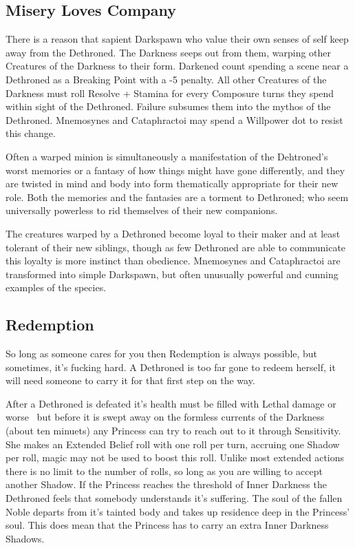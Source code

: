 \subsection*{Misery Loves Company}

There is a reason that sapient Darkspawn who value their own senses of self keep away from the Dethroned. The Darkness seeps out from them, warping other Creatures of the Darkness to their form. Darkened count spending a scene near a Dethroned as a Breaking Point with a -5 penalty. All other Creatures of the Darkness must roll Resolve + Stamina for every Composure turns they spend within sight of the Dethroned. Failure subsumes them into the mythos of the Dethroned. Mnemosynes and Cataphractoi may spend a Willpower dot to resist this change. 

Often a warped minion is simultaneously a manifestation of the Dehtroned's worst memories or a fantasy of how things might have gone differently, and they are twisted in mind and body into form thematically appropriate for their new role. Both the memories and the fantasies are a torment to Dethroned; who seem universally powerless to rid themselves of their new companions. 

The creatures warped by a Dethroned become loyal to their maker and at least tolerant of their new siblings, though as few Dethroned are able to communicate this loyalty is more instinct than obedience. Mnemosynes and Cataphractoi are transformed into simple Darkspawn, but often unusually powerful and cunning examples of the species. 

\subsection*{Redemption}

So long as someone cares for you then Redemption is always possible, but sometimes, it's fucking hard. A Dethroned is too far gone to redeem herself, it will need someone to carry it for that first step on the way. 

After a Dethroned is defeated \textendash it's health must be filled with Lethal damage or worse \textendash\, but before it is swept away on the formless currents of the Darkness (about ten minuets) any Princess can try to reach out to it through Sensitivity. She makes an Extended Belief roll with one roll per turn, accruing one Shadow per roll, magic may not be used to boost this roll. Unlike most extended actions there is no limit to the number of rolls, so long as you are willing to accept another Shadow. If the Princess reaches the threshold of Inner Darkness the Dethroned feels that somebody understands it's suffering. The soul of the fallen Noble departs from it's tainted body and takes up residence deep in the Princess' soul. This does mean that the Princess has to carry an extra Inner Darkness Shadows. 

